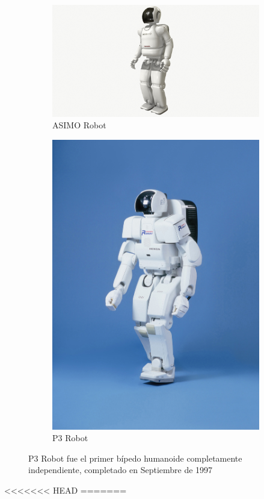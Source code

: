 \begin{figure}[H]
	\centering
	\begin{subfigure}[b]{0.5\textwidth}
		\centering
		\includegraphics[width=\textwidth]{images/ASIMO.jpg}
		\caption{ASIMO Robot}
		\label{fig:image1}
	\end{subfigure}
	\hfill
	\begin{subfigure}[b]{0.24\textwidth}
		\centering
		\includegraphics[width=\textwidth]{images/P3_robot.jpg}
		\caption{P3 Robot}
		\label{fig:image2}
	\end{subfigure}
	\caption{P3 Robot fue el primer bípedo humanoide completamente independiente, completado en Septiembre de 1997}
	\label{fig:parallel_images}
\end{figure}
<<<<<<< HEAD
=======

